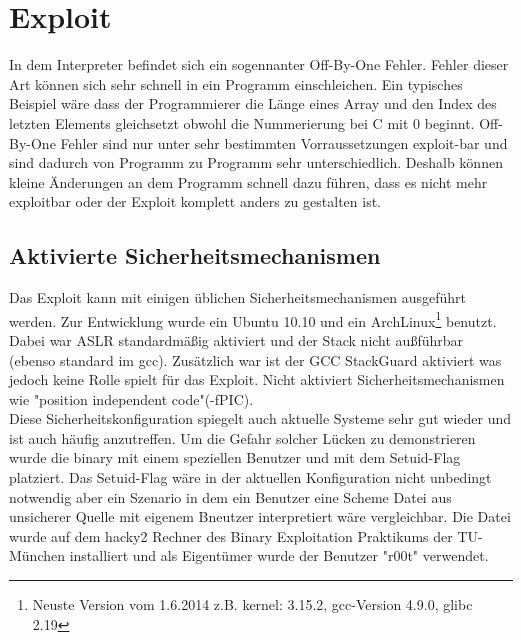 \section{Exploit}
In dem Interpreter befindet sich ein sogennanter Off-By-One Fehler. Fehler dieser Art können sich sehr schnell in ein Programm einschleichen. Ein typisches Beispiel wäre dass der Programmierer die Länge eines Array und den Index des letzten Elements gleichsetzt obwohl die Nummerierung bei C mit 0 beginnt. Off-By-One Fehler sind nur unter sehr bestimmten Vorraussetzungen exploit-bar und sind dadurch von Programm zu Programm sehr unterschiedlich. Deshalb können kleine Änderungen an dem Programm schnell dazu führen, dass es nicht mehr exploitbar oder der Exploit komplett anders zu gestalten ist.
\subsection{Aktivierte Sicherheitsmechanismen}
Das Exploit kann mit einigen üblichen Sicherheitsmechanismen ausgeführt werden. Zur Entwicklung wurde ein Ubuntu 10.10 und ein ArchLinux\footnote{Neuste Version vom 1.6.2014 z.B. kernel: 3.15.2, gcc-Version 4.9.0, glibc 2.19} benutzt. Dabei war ASLR standardmäßig aktiviert und der Stack nicht außführbar (ebenso standard im gcc). Zusätzlich war ist der GCC StackGuard aktiviert was jedoch keine Rolle spielt für das Exploit. Nicht aktiviert Sicherheitsmechanismen wie "position independent code"(-fPIC).
\\
Diese Sicherheitskonfiguration spiegelt auch aktuelle Systeme sehr gut wieder und ist auch häufig anzutreffen. Um die Gefahr solcher Lücken zu demonstrieren wurde die binary mit einem speziellen Benutzer und mit dem Setuid-Flag platziert. Das Setuid-Flag wäre in der aktuellen Konfiguration nicht unbedingt notwendig aber ein Szenario in dem ein Benutzer eine Scheme Datei aus unsicherer Quelle mit eigenem Bneutzer interpretiert wäre vergleichbar. Die Datei wurde auf dem hacky2 Rechner des Binary Exploitation Praktikums der TU-München installiert und als Eigentümer wurde der Benutzer "r00t" verwendet.

